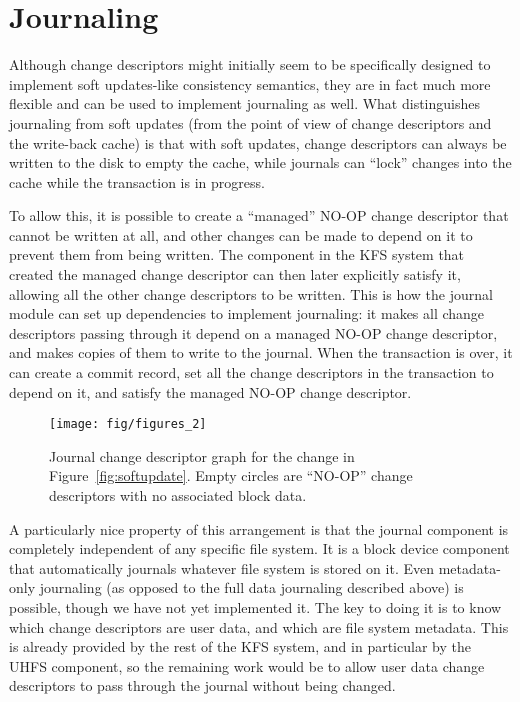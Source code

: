 \section{Journaling}
\label{sec:journal}

Although change descriptors might initially seem to be specifically designed to
implement soft updates-like consistency semantics, they are in fact much more
flexible and can be used to implement journaling as well. What distinguishes
journaling from soft updates (from the point of view of change descriptors and
the write-back cache) is that with soft updates, change descriptors can always
be written to the disk to empty the cache, while journals can ``lock'' changes
into the cache while the transaction is in progress.

To allow this, it is possible to create a ``managed'' NO-OP change descriptor
that cannot be written at all, and other changes can be made to depend on it to
prevent them from being written. The component in the KFS system that created
the managed change descriptor can then later explicitly satisfy it, allowing all
the other change descriptors to be written. This is how the journal module can
set up dependencies to implement journaling: it makes all change descriptors
passing through it depend on a managed NO-OP change descriptor, and makes copies
of them to write to the journal. When the transaction is over, it can create a
commit record, set all the change descriptors in the transaction to depend on
it, and satisfy the managed NO-OP change descriptor.

\begin{figure}
  \centering
  \texttt{[image: fig/figures\_2]}
  \caption{\label{fig:journal} Journal change descriptor graph for the
    change in Figure~\ref{fig:softupdate}. Empty circles are ``NO-OP''
    change descriptors with no associated block data.}
\end{figure}

A particularly nice property of this arrangement is that the journal component
is completely independent of any specific file system. It is a block device
component that automatically journals whatever file system is stored on it. Even
metadata-only journaling (as opposed to the full data journaling described
above) is possible, though we have not yet implemented it. The key to doing it
is to know which change descriptors are user data, and which are file system
metadata. This is already provided by the rest of the KFS system, and in
particular by the UHFS component, so the remaining work would be to allow user
data change descriptors to pass through the journal without being changed.
